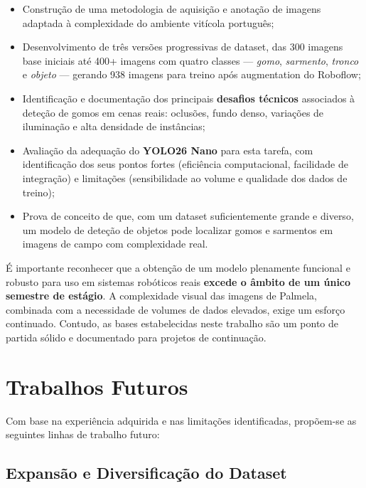 \begin{itemize}
  \item Construção de uma metodologia de aquisição e anotação de imagens
    adaptada à complexidade do ambiente vitícola português;

  \item Desenvolvimento de três versões progressivas de dataset, das 300
    imagens base iniciais até 400+ imagens com quatro classes —
    \textit{gomo}, \textit{sarmento}, \textit{tronco} e \textit{objeto}
    — gerando 938 imagens para treino após augmentation do Roboflow;

  \item Identificação e documentação dos principais \textbf{desafios
    técnicos} associados à deteção de gomos em cenas reais: oclusões, fundo
    denso, variações de iluminação e alta densidade de instâncias;

  \item Avaliação da adequação do \textbf{YOLO26 Nano} para esta tarefa,
    com identificação dos seus pontos fortes (eficiência computacional,
    facilidade de integração) e limitações (sensibilidade ao volume e
    qualidade dos dados de treino);

  \item Prova de conceito de que, com um dataset suficientemente grande e
    diverso, um modelo de deteção de objetos pode localizar gomos e
    sarmentos em imagens de campo com complexidade real.
\end{itemize}

É importante reconhecer que a obtenção de um modelo plenamente funcional e
robusto para uso em sistemas robóticos reais \textbf{excede o âmbito de um
único semestre de estágio}. A complexidade visual das imagens de Palmela,
combinada com a necessidade de volumes de dados elevados, exige um esforço
continuado. Contudo, as bases estabelecidas neste trabalho são um ponto de
partida sólido e documentado para projetos de continuação.

\section{Trabalhos Futuros}

Com base na experiência adquirida e nas limitações identificadas, propõem-se
as seguintes linhas de trabalho futuro:

\subsection{Expansão e Diversificação do Dataset}

